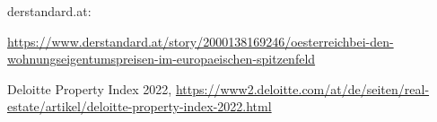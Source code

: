 \documentclass{article}
\begin{document}
\begin{thebibliography}{9}

	derstandard.at: 
	
		\href{https://www.derstandard.at/story/2000138169246/oesterreichbei-den-wohnungseigentumspreisen-im-europaeischen-spitzenfeld}{https://www.derstandard.at/story/2000138169246/oesterreichbei-den-wohnungseigentumspreisen-im-europaeischen-spitzenfeld}

	Deloitte Property Index 2022,
		\href{https://www2.deloitte.com/at/de/seiten/real-estate/artikel/deloitte-property-index-2022.html}{https://www2.deloitte.com/at/de/seiten/real-estate/artikel/deloitte-property-index-2022.html}


	
\end{thebibliography}
\end{document}
